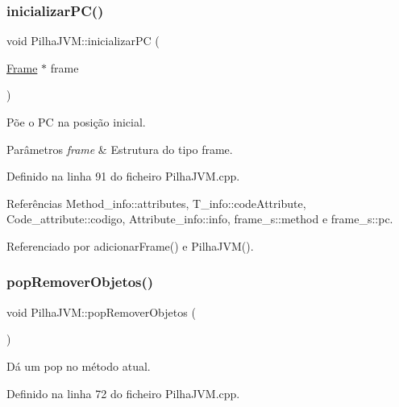\subsubsection{\texorpdfstring{inicializar\+P\+C()}{inicializarPC()}}
{\footnotesize\ttfamily void Pilha\+J\+V\+M\+::inicializar\+PC (\begin{DoxyParamCaption}\item[{\hyperlink{PilhaJVM_8h_acc380914b41a084dcc8e4b38fb200145}{Frame} $\ast$}]{frame }\end{DoxyParamCaption})\hspace{0.3cm}{\ttfamily [private]}}



Põe o PC na posição inicial. 


\begin{DoxyParams}{Parâmetros}
{\em frame} & Estrutura do tipo frame. \\
\hline
\end{DoxyParams}


Definido na linha 91 do ficheiro Pilha\+J\+V\+M.\+cpp.



Referências Method\+\_\+info\+::attributes, T\+\_\+info\+::code\+Attribute, Code\+\_\+attribute\+::codigo, Attribute\+\_\+info\+::info, frame\+\_\+s\+::method e frame\+\_\+s\+::pc.



Referenciado por adicionar\+Frame() e Pilha\+J\+V\+M().

\mbox{\label{classPilhaJVM_a4f83f8d59b436cb1813a2a35e1538045}} 
\subsubsection{\texorpdfstring{pop\+Remover\+Objetos()}{popRemoverObjetos()}}
{\footnotesize\ttfamily void Pilha\+J\+V\+M\+::pop\+Remover\+Objetos (\begin{DoxyParamCaption}{ }\end{DoxyParamCaption})}



Dá um pop no método atual. 



Definido na linha 72 do ficheiro Pilha\+J\+V\+M.\+cpp.



